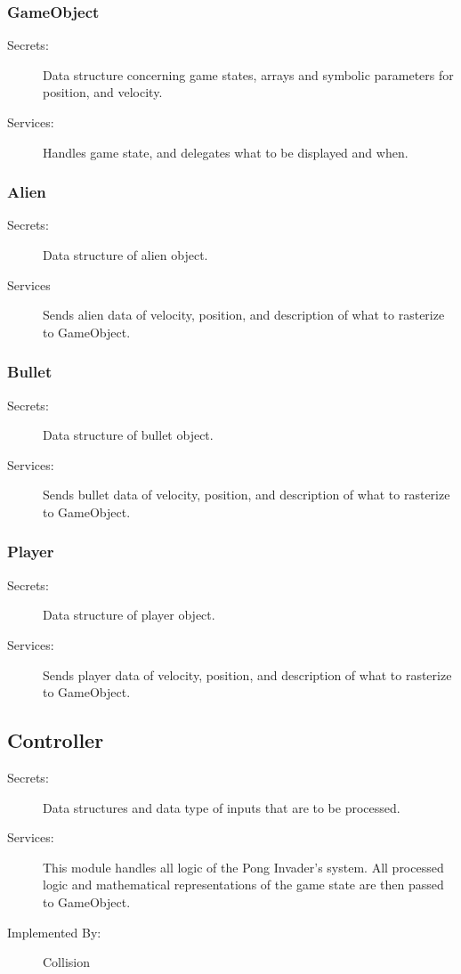 \documentclass[12pt, titlepage]{article}
\begin{document}
\subsubsection{GameObject}
\begin{description}
\item[Secrets:] Data structure concerning game states, arrays and symbolic parameters for position, and velocity.
\item[Services:] Handles game state, and delegates what to be displayed and when.
\end{description}

\subsubsection{Alien}
\begin{description}
\item[Secrets:] Data structure of alien object.
\item[Services] Sends alien data of velocity, position, and description of what to rasterize to GameObject.
\end{description}

\subsubsection{Bullet}
\begin{description}
\item[Secrets:] Data structure of bullet object.
\item[Services:] Sends bullet data of velocity, position, and description of what to rasterize to GameObject.
\end{description}

\subsubsection{Player}
\begin{description}
\item[Secrets:] Data structure of player object.
\item[Services:] Sends player data of velocity, position, and description of what to rasterize to GameObject.
\end{description}

\subsection{Controller}
\begin{description}
\item[Secrets:] Data structures and data type of inputs that are to be processed.
\item[Services:] This module handles all logic of the Pong Invader's system. All processed logic and mathematical representations of the game state are then passed to GameObject. 
\item[Implemented By:] Collision
\end{description}
\end{document}
